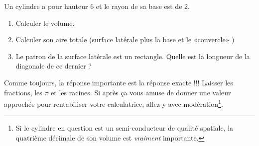 
\begin{exercice}\label{exosmath-0009}

    Un cylindre a pour hauteur \unit{6}{\centi\meter} et le rayon de sa base est de \unit{2}{\centi\meter}.
    \begin{enumerate}
        \item
            Calculer le volume.
        \item
            Calculer son aire totale (surface latérale plus la base et le «couvercle» )
        \item
            Le patron de la surface latérale est un rectangle. Quelle est la longueur de la diagonale de ce dernier ?
    \end{enumerate}
    Comme toujours, la réponse importante est la réponse exacte !!! Laisser les fractions, les \( \pi\) et les racines. Si après ça vous amuse de donner une valeur approchée pour rentabiliser votre calculatrice, allez-y avec modération\footnote{Si le cylindre en question est un semi-conducteur de qualité spatiale, la quatrième décimale de son volume est \emph{vraiment} importante.}.

\end{exercice}
